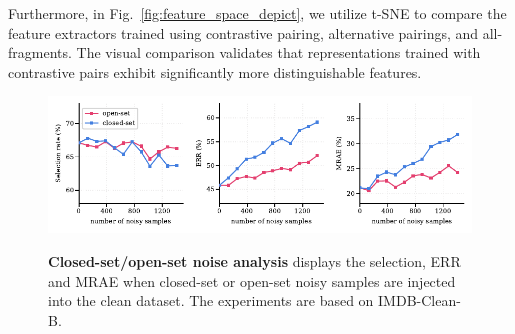\documentclass{article}
\theoremstyle{plain}
\theoremstyle{definition}
\theoremstyle{remark}
\begin{document}
Furthermore, in Fig.~\ref{fig:feature_space_depict}, we utilize t-SNE to compare the feature extractors trained using contrastive pairing, alternative pairings, and all-fragments. 
The visual comparison validates that representations trained with contrastive pairs exhibit significantly more distinguishable features.


\begin{figure}[th]
\begin{center}
\centerline{\includegraphics[width=\textwidth]{imgs/disruptive_analysis_wide_neurips.pdf}}
\caption{
\textbf{Closed-set/open-set noise analysis} displays the selection, ERR and MRAE
when closed-set or open-set noisy samples are injected into the clean dataset.
The experiments are based on IMDB-Clean-B.
}
\vskip -0.3in
\label{fig:disruptive_analysis}
\end{center}
\end{figure}
\end{document}

